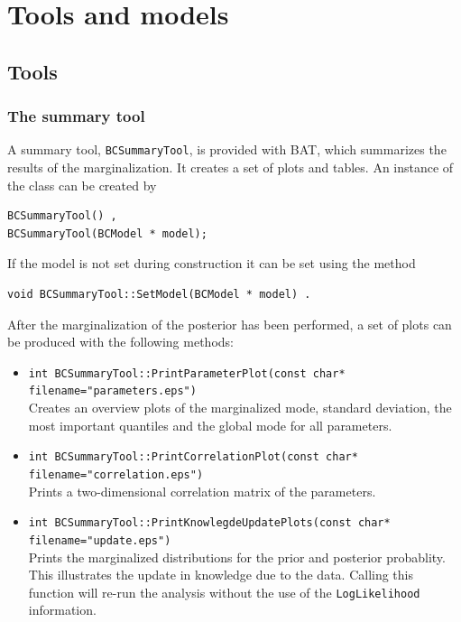 \documentclass[11pt, a4paper]{article}
\newcommand{\bat}{{\sc BAT}}
\newcommand{\BAT}{\bat}
\begin{document}

\clearpage
\pagebreak

\section{Tools and models}
\label{section:tools}

\subsection{Tools}
\label{subsection:tools}

\subsubsection{The summary tool}

A summary tool, \verb|BCSummaryTool|, is provided with \BAT, which
summarizes the results of the marginalization. It creates a set of
plots and tables. An instance of the class can be created by
%
\begin{verbatim}
BCSummaryTool() ,
BCSummaryTool(BCModel * model);
\end{verbatim}
%
If the model is not set during construction it can be set using the
method
%
\begin{verbatim}
void BCSummaryTool::SetModel(BCModel * model) .
\end{verbatim}

After the marginalization of the posterior has been performed, a
set of plots can be produced with the following methods:
%
\begin{itemize}
\item \verb|int BCSummaryTool::PrintParameterPlot(const char* filename="parameters.eps")|\\
  Creates an overview plots of the marginalized mode, standard
  deviation, the most important quantiles and the global mode for all
  parameters.

\item \verb|int BCSummaryTool::PrintCorrelationPlot(const char* filename="correlation.eps")|\\
  Prints a two-dimensional correlation matrix of the parameters.

\item \verb|int BCSummaryTool::PrintKnowlegdeUpdatePlots(const char* filename="update.eps")|\\
  Prints the marginalized distributions for the prior and posterior
  probablity. This illustrates the update in knowledge due to the
  data. Calling this function will re-run the analysis without the use
  of the \verb|LogLikelihood| information.
\end{itemize}
\end{document}
